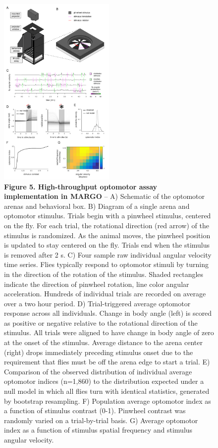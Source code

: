 \documentclass[10pt]{article}
\begin{document}
\clearpage
\begin{figure}[h!]
	\begin{center}
		\includegraphics[width=0.5\textwidth]{../figures/optomotor_panel_sm.pdf}
	\end{center}
	\caption*{\footnotesize \textbf{Figure 5. High-throughput optomotor assay implementation in MARGO} -- A) Schematic of the optomotor arenas and behavioral box. B) Diagram of a single arena and optomotor stimulus. Trials begin with a pinwheel stimulus, centered on the fly. For each trial, the rotational direction (red arrow) of the stimulus is randomized. As the animal moves, the pinwheel position is updated to stay centered on the fly. Trials end when the stimulus is removed after 2 s. C) Four sample raw individual angular velocity time series. Flies typically respond to optomotor stimuli by turning in the direction of the rotation of the stimulus. Shaded rectangles indicate the direction of pinwheel rotation, line color angular acceleration. Hundreds of individual trials are recorded on average over a two hour period. D) Trial-triggered average optomotor response across all individuals. Change in body angle (left) is scored as positive or negative relative to the rotational direction of the stimulus. All trials were aligned to have change in body angle of zero at the onset of the stimulus. Average distance to the arena center (right) drops immediately preceding stimulus onset due to the requirement that flies must be off the arena edge to start a trial. E) Comparison of the observed distribution of individual average optomotor indices (n=1,860) to the distribution expected under a null model in which all flies turn with identical statistics, generated by bootstrap resampling. F) Population average optomotor index as a function of stimulus contrast (0-1). Pinwheel contrast was randomly varied on a trial-by-trial basis. G) Average optomotor index as a function of stimulus spatial frequency and stimulus angular velocity.}
\end{figure}
\end{document}
